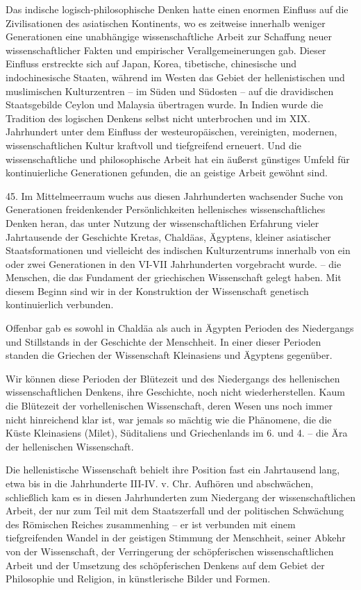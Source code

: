 \documentclass[11pt,a4paper]{book}
\begin{document}
Das indische logisch-philosophische Denken hatte einen enormen Einfluss auf die Zivilisationen des asiatischen Kontinents, wo es zeitweise innerhalb weniger Generationen eine unabhängige wissenschaftliche Arbeit zur Schaffung neuer wissenschaftlicher Fakten und empirischer Verallgemeinerungen gab. Dieser Einfluss erstreckte sich auf Japan, Korea, tibetische, chinesische und indochinesische Staaten, während im Westen das Gebiet der hellenistischen und muslimischen Kulturzentren -- im Süden und Südosten -- auf die dravidischen Staatsgebilde Ceylon und Malaysia übertragen wurde. In Indien wurde die Tradition des logischen Denkens selbst nicht unterbrochen und im XIX. Jahrhundert unter dem Einfluss der westeuropäischen, vereinigten, modernen, wissenschaftlichen Kultur kraftvoll und tiefgreifend erneuert. Und die wissenschaftliche und philosophische Arbeit hat ein äußerst günstiges Umfeld für kontinuierliche Generationen gefunden, die an geistige Arbeit gewöhnt sind. 

45. Im Mittelmeerraum wuchs aus diesen Jahrhunderten wachsender Suche von Generationen freidenkender Persönlichkeiten hellenisches wissenschaftliches Denken heran, das unter Nutzung der wissenschaftlichen Erfahrung vieler Jahrtausende der Geschichte Kretas, Chaldäas, Ägyptens, kleiner asiatischer Staatsformationen und vielleicht des indischen Kulturzentrums innerhalb von ein oder zwei Generationen in den VI-VII Jahrhunderten vorgebracht wurde. -- die Menschen, die das Fundament der griechischen Wissenschaft gelegt haben. Mit diesem Beginn sind wir in der Konstruktion der Wissenschaft genetisch kontinuierlich verbunden. 

Offenbar gab es sowohl in Chaldäa als auch in Ägypten Perioden des Niedergangs und Stillstands in der Geschichte der Menschheit. In einer dieser Perioden standen die Griechen der Wissenschaft Kleinasiens und Ägyptens gegenüber. 

Wir können diese Perioden der Blütezeit und des Niedergangs des hellenischen wissenschaftlichen Denkens, ihre Geschichte, noch nicht wiederherstellen. Kaum die Blütezeit der vorhellenischen Wissenschaft, deren Wesen uns noch immer nicht hinreichend klar ist, war jemals so mächtig wie die Phänomene, die die Küste Kleinasiens (Milet), Süditaliens und Griechenlands im 6. und 4. -- die Ära der hellenischen Wissenschaft. 

Die hellenistische Wissenschaft behielt ihre Position fast ein Jahrtausend lang, etwa bis in die Jahrhunderte III-IV. v. Chr. Aufhören und abschwächen, schließlich kam es in diesen Jahrhunderten zum Niedergang der wissenschaftlichen Arbeit, der nur zum Teil mit dem Staatszerfall und der politischen Schwächung des Römischen Reiches zusammenhing -- er ist verbunden mit einem tiefgreifenden Wandel in der geistigen Stimmung der Menschheit, seiner Abkehr von der Wissenschaft, der Verringerung der schöpferischen wissenschaftlichen Arbeit und der Umsetzung des schöpferischen Denkens auf dem Gebiet der Philosophie und Religion, in künstlerische Bilder und Formen. 
\end{document}
